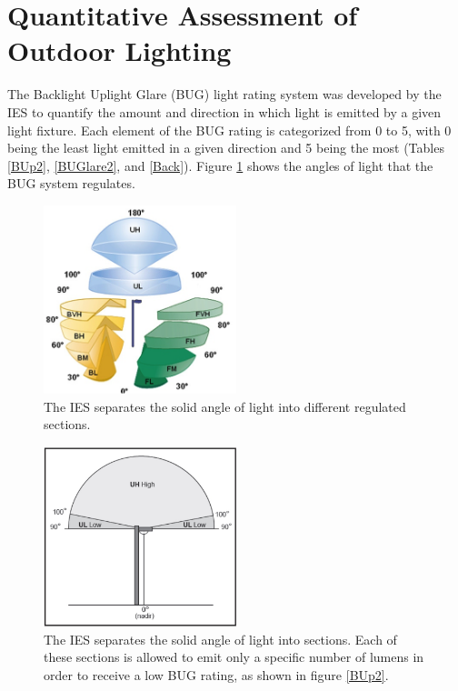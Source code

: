 \documentclass[12pt, oneside]{article}
\begin{document}
\section{Quantitative Assessment of Outdoor Lighting}
The Backlight Uplight Glare (BUG) light rating system was developed by the IES to quantify the amount and direction in which light is emitted by a given light fixture. Each element of the BUG rating is categorized from 0 to 5, with 0 being the least light emitted in a given direction and 5 being the most (Tables \ref{BUp2}, \ref{BUGlare2}, and \ref{Back}). Figure \ref{BUG3D} shows the angles of light that the BUG system regulates.
\begin{figure}[p]
	\centering
	\includegraphics[width=0.5\textwidth]{BUG3D.png}
	\caption[BUG 3D diagram]{The IES separates the solid angle of light into different regulated sections.}
	\label{BUG3D}
\end{figure}
\begin{figure}[p]
	\centering
	\includegraphics[width=0.5\textwidth]{uplight.jpg}
	\caption[BUG uplighting solid angles]{The IES separates the solid angle of light into sections. Each of these sections is allowed to emit only a specific number of lumens in order to receive a low BUG rating, as shown in figure \ref{BUp2}.}
	\label{BUp}
\end{figure}
\end{document}
